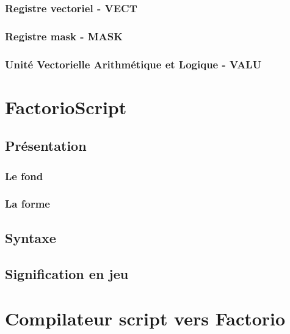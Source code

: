 \documentclass{scrreprt}
\begin{document}
	\section{Registre vectoriel - VECT}
	
	\section{Registre mask - MASK}
	
	\section{Unité Vectorielle Arithmétique et Logique - VALU}
	
	
	\part{FactorioScript}
	
	\chapter{Présentation}
	\section{Le fond}
	
	\section{La forme}
	
	\chapter{Syntaxe}
	
	\chapter{Signification en jeu}
	
	\part{Compilateur script vers Factorio}
	
\end{document}
